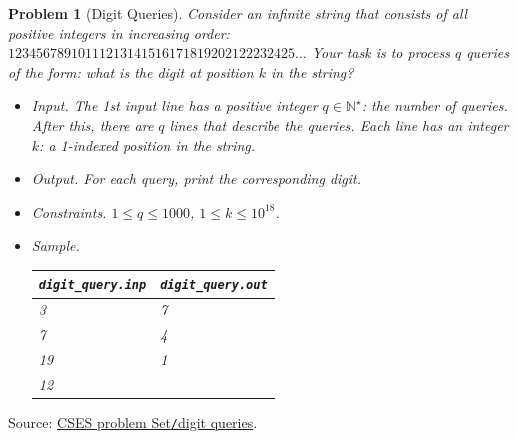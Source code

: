 \documentclass{article}
\newtheorem{problem}{Problem}
\begin{document}
\begin{problem}[Digit Queries]
	Consider an infinite string that consists of all positive integers in increasing order: $12345678910111213141516171819202122232425\ldots$ Your task is to process $q$ queries of the form: what is the digit at position $k$ in the string?
	\begin{itemize}
		\item {\sf Input.} The 1st input line has a positive integer $q\in\mathbb{N}^\star$: the number of queries. After this, there are $q$ lines that describe the queries. Each line has an integer $k$: a 1-indexed position in the string.
		\item {\sf Output.} For each query, print the corresponding digit.
		\item {\sf Constraints.} $1\le q\le1000$, $1\le k\le10^{18}$.
		\item {\sf Sample.}
		\begin{table}[H]
			\centering
			\begin{tabular}{|l|l|}
				\hline
				\verb|digit_query.inp| & \verb|digit_query.out| \\
				\hline
				3 & 7 \\
				7 & 4 \\
				19 & 1 \\
				12 & \\
				\hline
			\end{tabular}
		\end{table}
	\end{itemize}
\end{problem}
Source: \href{https://cses.fi/problemset/task/2431}{CSES problem Set{\tt/}digit queries}.
\end{document}
